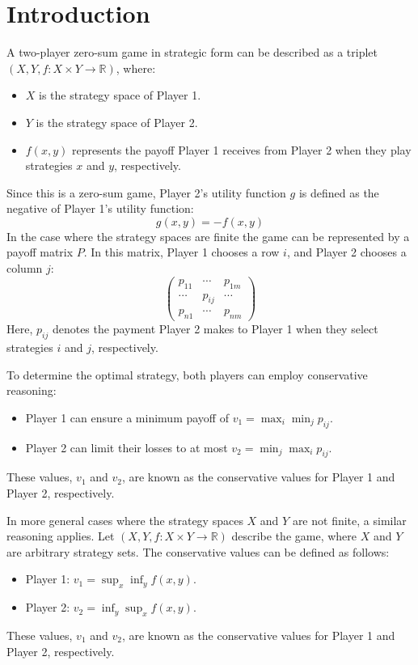 \section{Introduction}

\begin{definition}
    A two-player zero-sum game in strategic form can be described as a triplet $(X, Y , f : X \times Y \rightarrow \mathbb{R})$, where:
    \begin{itemize}
        \item $X$ is the strategy space of Player 1.
        \item $Y$ is the strategy space of Player 2.
        \item $f(x, y)$ represents the payoff Player 1 receives from Player 2 when they play strategies $x$ and $y$, respectively.
    \end{itemize}
\end{definition}
\noindent Since this is a zero-sum game, Player 2's utility function $g$ is defined as the negative of Player 1's utility function:
\[g(x,y)=-f(x,y)\]
\noindent In the case where the strategy spaces are finite the game can be represented by a payoff matrix $P$. 
In this matrix, Player 1 chooses a row $i$, and Player 2 chooses a column $j$:
\[\begin{pmatrix} p_{11} & \cdots & p_{1m} \\ \cdots & p_{ij} & \cdots \\ p_{n1} & \cdots & p_{nm} \end{pmatrix}\]
\noindent Here, $p_{ij}$ denotes the payment Player 2 makes to Player 1 when they select strategies $i$ and $j$, respectively.

To determine the optimal strategy, both players can employ conservative reasoning: 
\begin{itemize} 
    \item Player 1 can ensure a minimum payoff of $v_1 = \max_i \min_j p_{ij}$. 
    \item Player 2 can limit their losses to at most $v_2 = \min_j \max_i p_{ij}$. 
\end{itemize}
\noindent These values, $v_1$ and $v_2$, are known as the conservative values for Player 1 and Player 2, respectively.

In more general cases where the strategy spaces $X$ and $Y$ are not finite, a similar reasoning applies. 
Let $(X, Y, f:X\times Y\rightarrow\mathbb{R})$ describe the game, where $X$ and $Y$ are arbitrary strategy sets. 
The conservative values can be defined as follows: 
\begin{itemize} 
    \item Player 1: $v_1 = \sup_x \inf_y f(x, y)$.
    \item Player 2: $v_2 = \inf_y \sup_x f(x, y)$. 
\end{itemize}
\noindent These values, $v_1$ and $v_2$, are known as the conservative values for Player 1 and Player 2, respectively. 